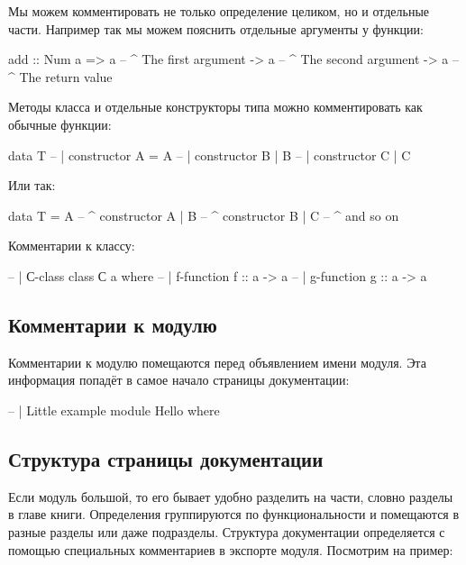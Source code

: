 Мы можем комментировать не только определение целиком,
но и отдельные части. Например так мы можем пояснить 
отдельные аргументы у функции:

\begin{code}
add :: Num a => a   -- ^ The first argument
             -> a   -- ^ The second argument   
             -> a   -- ^ The return value   
\end{code}

Методы класса и отдельные конструкторы типа можно комментировать
как обычные функции:

\begin{code}
data T
        -- | constructor A    
       = A      
        -- | constructor B
       | B      
        -- | constructor C
       | C     
\end{code}

Или так:

\begin{code}
data T = A      -- ^ constructor A
       | B      -- ^ constructor B
       | C      -- ^ and so on
\end{code}

Комментарии к классу:

\begin{code}
-- | С-class
class С a where
    -- | f-function
    f :: a -> a
    -- | g-function
    g :: a -> a
\end{code}

\subsection{Комментарии к модулю}

Комментарии к модулю помещаются перед объявлением имени
модуля. Эта информация попадёт в самое начало страницы документации:


\begin{code}
-- | Little example
module Hello where
\end{code}

\subsection{Структура страницы документации}

Если модуль большой, то его бывает удобно разделить 
на части, словно разделы в главе книги. Определения 
группируются по функциональности и помещаются в разные разделы
или даже подразделы.
Структура документации определяется с помощью специальных
комментариев в экспорте модуля. Посмотрим на пример:



